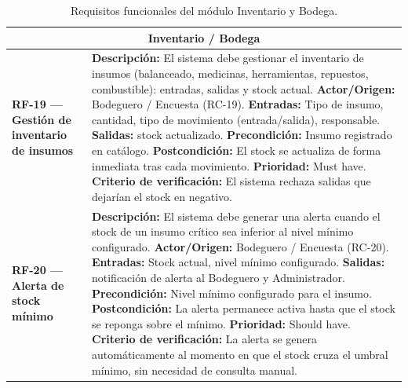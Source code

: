 \documentclass[11pt,a4paper]{article}
\begin{document}
\begin{longtable}{|p{3.5cm}|p{12cm}|}
\caption{Requisitos funcionales del módulo Inventario y Bodega.}
\label{tab:rf-inventario} \\
\hline

\multicolumn{2}{|c|}{\textbf{Inventario / Bodega}} \\ \hline

\textbf{RF-19 — Gestión de inventario de insumos} &
\textbf{Descripción:} El sistema debe gestionar el inventario de insumos (balanceado, medicinas, herramientas, repuestos, combustible): entradas, salidas y stock actual. \newline
\textbf{Actor/Origen:} Bodeguero / Encuesta (RC-19). \newline
\textbf{Entradas:} Tipo de insumo, cantidad, tipo de movimiento (entrada/salida), responsable. \newline
\textbf{Salidas:} stock actualizado. \newline
\textbf{Precondición:} Insumo registrado en catálogo. \newline
\textbf{Postcondición:} El stock se actualiza de forma inmediata tras cada movimiento. \newline
\textbf{Prioridad:} Must have. \newline
\textbf{Criterio de verificación:} El sistema rechaza salidas que dejarían el stock en negativo. \\ \hline

\textbf{RF-20 — Alerta de stock mínimo} &
\textbf{Descripción:} El sistema debe generar una alerta cuando el stock de un insumo crítico sea inferior al nivel mínimo configurado. \newline
\textbf{Actor/Origen:} Bodeguero / Encuesta (RC-20). \newline
\textbf{Entradas:} Stock actual, nivel mínimo configurado. \newline
\textbf{Salidas:} notificación de alerta al Bodeguero y Administrador. \newline
\textbf{Precondición:} Nivel mínimo configurado para el insumo. \newline
\textbf{Postcondición:} La alerta permanece activa hasta que el stock se reponga sobre el mínimo. \newline
\textbf{Prioridad:} Should have. \newline
\textbf{Criterio de verificación:} La alerta se genera automáticamente al momento en que el stock cruza el umbral mínimo, sin necesidad de consulta manual. \\ \hline

\end{longtable}
\end{document}

